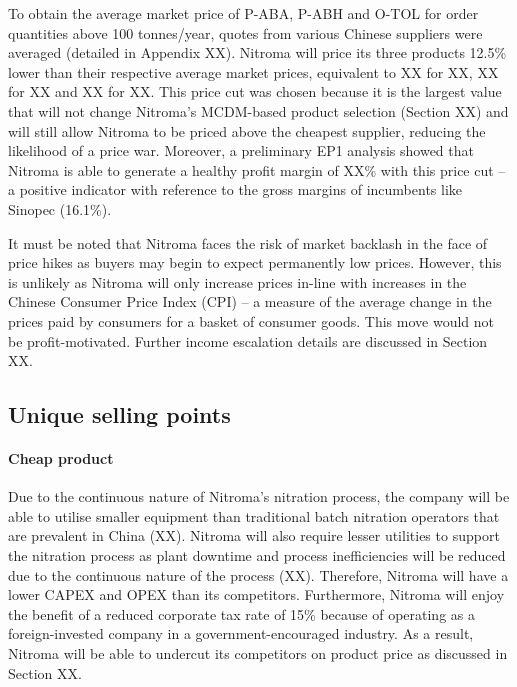 To obtain the average market price of P-ABA, P-ABH and O-TOL for order quantities above 100 tonnes/year, quotes from various Chinese suppliers were averaged (detailed in Appendix XX).  Nitroma will price its three products 12.5\% lower than their respective average market prices, equivalent to XX for XX, XX for XX and XX for XX. This price cut was chosen because it is the largest value that will not change Nitroma’s MCDM-based product selection (Section XX) and will still allow Nitroma to be priced above the cheapest supplier, reducing the likelihood of a price war. Moreover, a preliminary EP1 analysis showed that Nitroma is able to generate a healthy profit margin of XX\% with this price cut – a positive indicator with reference to the gross margins of incumbents like Sinopec (16.1\%). 

It must be noted that Nitroma faces the risk of market backlash in the face of price hikes as buyers may begin to expect permanently low prices. However, this is unlikely as Nitroma will only increase prices in-line with increases in the Chinese Consumer Price Index (CPI) – a measure of the average change in the prices paid by consumers for a basket of consumer goods. This move would not be profit-motivated. Further income escalation details are discussed in Section XX.

\subsection{Unique selling points}
\paragraph{Cheap product}
Due to the continuous nature of Nitroma’s nitration process, the company will be able to utilise smaller equipment than traditional batch nitration operators that are prevalent in China (XX). Nitroma will also require lesser utilities to support the nitration process as plant downtime and process inefficiencies will be reduced due to the continuous nature of the process (XX). Therefore, Nitroma will have a lower CAPEX and OPEX than its competitors. Furthermore, Nitroma will enjoy the benefit of a reduced corporate tax rate of 15\% because of operating as a foreign-invested company in a government-encouraged industry. As a result, Nitroma will be able to undercut its competitors on product price as discussed in Section XX.

